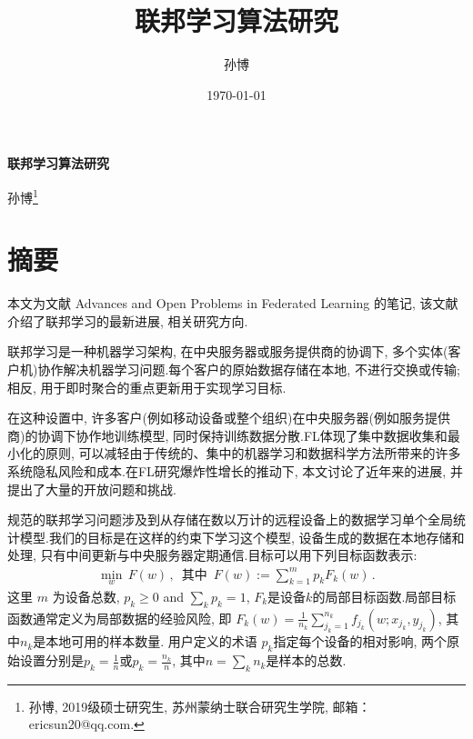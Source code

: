 \documentclass[a4paper]{article}
\title{联邦学习算法研究}
\author{孙博}
\date{\today}
\begin{document}

\maketitle
\tableofcontents 

\newpage
\centerline{\huge \bf 联邦学习算法研究}
\vspace{5mm}
\centerline{%
孙博\footnote{孙博, 2019级硕士研究生, 苏州蒙纳士联合研究生学院, 邮箱：ericsun20@qq.com.} 
}
\vspace{5mm}

\section*{摘要}


本文为文献 Advances and Open Problems in Federated Learning \citep{arxiv-Kairouz-Mcmahan-etc2019} 的笔记, 该文献介绍了联邦学习的最新进展, 相关研究方向.
  
联邦学习是一种机器学习架构, 在中央服务器或服务提供商的协调下, 多个实体(客户机)协作解决机器学习问题.每个客户的原始数据存储在本地, 不进行交换或传输;相反, 用于即时聚合的重点更新用于实现学习目标. 

在这种设置中, 许多客户(例如移动设备或整个组织)在中央服务器(例如服务提供商)的协调下协作地训练模型, 同时保持训练数据分散.FL体现了集中数据收集和最小化的原则, 可以减轻由于传统的、集中的机器学习和数据科学方法所带来的许多系统隐私风险和成本.在FL研究爆炸性增长的推动下, 本文讨论了近年来的进展, 并提出了大量的开放问题和挑战. 

规范的联邦学习问题涉及到从存储在数以万计的远程设备上的数据学习单个全局统计模型.我们的目标是在这样的约束下学习这个模型, 设备生成的数据在本地存储和处理, 只有中间更新与中央服务器定期通信.目标可以用下列目标函数表示:
\begin{align*}
    \min_w \,  F(w) \,  ,  \, \, \,  \text{其中} \, \, \,  F(w) := \sum_{k=1}^m p_k F_k(w) \,  . \label{eq:original_obj}
\end{align*}
这里 $m$ 为设备总数,  $p_k \geq 0$ and $\sum_k p_k=1$,   $F_k$是设备$k$的局部目标函数.局部目标函数通常定义为局部数据的经验风险,  即 $F_k(w) = \frac{1}{n_k}\sum_{j_k=1}^{n_k} f_{j_k}(w; x_{j_k},  y_{j_k})$,  其中$n_k$是本地可用的样本数量. 用户定义的术语 $p_k$指定每个设备的相对影响, 两个原始设置分别是$p_k=\frac{1}{n}$或$p_k=\frac{n_k}{n}$, 其中$n=\sum_k n_k$是样本的总数.\citep{li2019federated}
 
\end{document}
